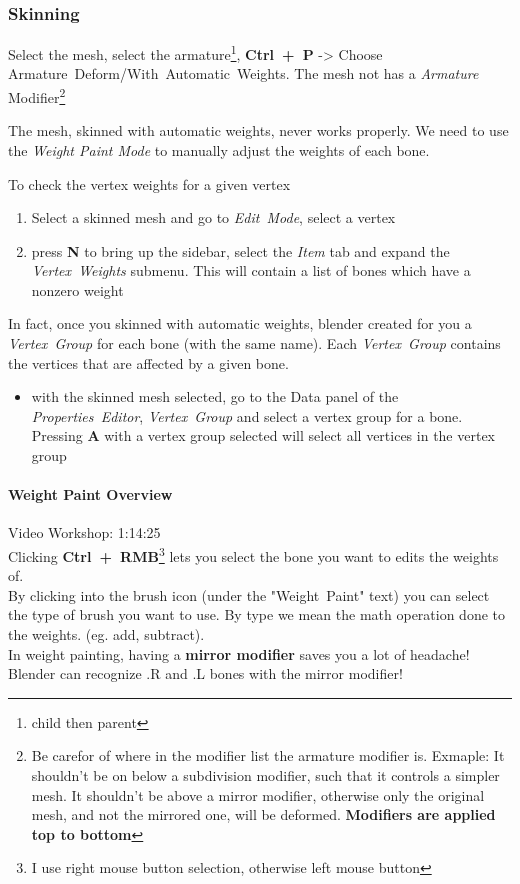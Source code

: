 \documentclass{article}
\begin{document}
\subsubsection{Skinning}
Select the mesh, select the armature\footnote{child then parent}, \mbox{\textbf{Ctrl + P}} -> Choose \mbox{Armature Deform/With Automatic Weights}. The mesh not has a \textit{Armature} Modifier\footnote{Be 
carefor of where in the modifier list the armature modifier is. Exmaple: It shouldn't be on below a subdivision modifier, such that it controls a simpler mesh. It shouldn't be above a mirror modifier, 
otherwise only the original mesh, and not the mirrored one, will be deformed. \textbf{Modifiers are applied top to bottom}}\par
The mesh, skinned with automatic weights, never works properly. We need to use the \textit{Weight Paint Mode} to manually adjust the weights of each bone.\par
To check the vertex weights for a given vertex
\begin{enumerate}[noitemsep, topsep=0pt]
    \item Select a skinned mesh and go to \mbox{\textit{Edit Mode}}, select a vertex
    \item press \textbf{N} to bring up the sidebar, select the \textit{Item} tab and expand the \mbox{\textit{Vertex Weights}} submenu. This will contain a list of bones which have a nonzero weight
\end{enumerate}
In fact, once you skinned with automatic weights, blender created for you a \mbox{\textit{Vertex Group}} for each bone (with the same name). Each \mbox{\textit{Vertex Group}} contains the vertices that 
are affected by a given bone.
\begin{itemize}[noitemsep, topsep=0pt]
    \item with the skinned mesh selected, go to the Data panel of the \mbox{\textit{Properties Editor}}, \mbox{\textit{Vertex Group}} and select a vertex group for a bone. Pressing \textbf{A} with a 
    vertex group selected will select all vertices in the vertex group
\end{itemize}

\paragraph{Weight Paint Overview}
Video Workshop: 1:14:25\\
Clicking \mbox{\textbf{Ctrl + RMB}}\footnote{I use right mouse button selection, otherwise left mouse button} lets you select the bone you want to edits the weights of.\\
By clicking into the brush icon (under the \mbox{"Weight Paint"} text) you can select the type of brush you want to use. By type we mean the math operation done to the weights. (eg. add, subtract).\\
In weight painting, having a \textbf{mirror modifier} saves you a lot of headache! Blender can recognize .R and .L bones with the mirror modifier!\\
\end{document}
